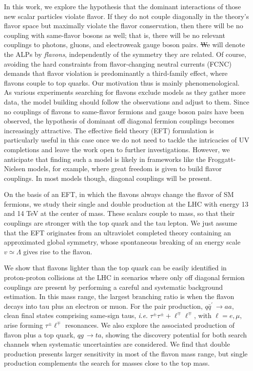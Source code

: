 \documentclass[prd,amsfonts,onecolumn,superscriptaddress,aps,nofootinbib,11pt]{revtex4-1}
\begin{document}
In this work, we explore the hypothesis that the dominant interactions of those new scalar particles violate flavor. If they do not couple diagonally in the theory's flavor space but maximally violate the flavor conservation, then there will be no coupling with same-flavor bosons as well; that is, there will be no relevant couplings to photons, gluons, and electroweak gauge boson pairs. \st We will denote the ALPs by \textit{flavons}, independently of the symmetry they are related. Of course, avoiding the hard constraints from flavor-changing neutral currents (FCNC) demands that flavor violation is predominantly a third-family effect, where flavons couple to top quarks. Our motivation thus is mainly phenomenological. As various experiments searching for flavons exclude models as they gather more data, the model building should follow the observations and adjust to them. Since no couplings of flavons to same-flavor fermions and gauge boson pairs have been observed, the hypothesis of dominant off diagonal fermion couplings becomes increasingly attractive. The effective field theory (EFT) formulation is particularly useful in this case once we do not need to tackle the intricacies of UV completions and leave the work open to further investigations. However, we anticipate that finding such a model is likely in frameworks like the Froggatt-Nielsen models, for example, where great freedom is given to build flavor couplings. In most models though, diagonal couplings will be present.

On the basis of an EFT, in which the flavons always change the flavor of SM fermions, we study their single and double production at the LHC with energy 13 and 14 TeV at the center of mass. These scalars couple to mass, so that their couplings are stronger with the top quark and the tau lepton. We just assume that the EFT originates from an ultraviolet completed theory containing an approximated global symmetry, whose spontaneous breaking of an energy scale $v\simeq\Lambda$ gives rise to the flavon. 

We show that flavons lighter than the top quark can be easily identified in proton-proton collisions at the LHC in scenarios where only off diagonal fermion couplings are present by performing a careful and systematic background estimation. In this mass range, the largest branching ratio is when the flavon decays into tau plus an electron or muon. For the pair production, $q\bar{q}^\prime\,\rightarrow aa$, clean final states comprising same-sign taus, \textit{i.e.} $\tau^{\pm}\tau^{\pm}+\ell^\mp\ell^\mp$, with $\ell=e,\mu$, arise forming $\tau^\pm\ell^\mp$ resonances. We also explore the associated production of flavon plus a top quark, $qg \,\rightarrow ta$, showing the discovery potential for both search channels when systematic uncertainties are considered. We find that double production presents larger sensitivity in most of the flavon mass range, but single production complements the search for masses close to the top mass. 
\end{document}

